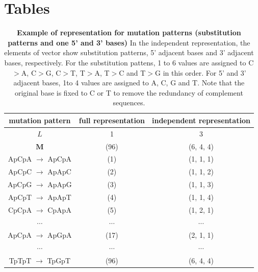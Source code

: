 \newpage

 \section*{Tables}
% 
%
%




\begin{table}[!ht]
\caption{
{\bf Example of representation for mutation patterns (substitution patterns and one 5' and 3' bases)}
In the independent representation, the elements of vector show substitution patterns, 5' adjacent bases and 3' adjacent bases, respectively.
For the substitution pattens, 1 to 6 values are assigned to C$>$A, C$>$G, C$>$T, T$>$A, T$>$C and T$>$G in this order.
For 5' and 3' adjacent bases, 1to 4 values are assigned to A, C, G and T.
Note that the original base is fixed to C or T to remove the redundancy of complement sequences.
}
\begin{center}
\begin{tabular}{|c|c|c|} \hline
mutation pattern & full representation & independent representation  \\ \hline
$L$ & 1  & 3  \\
$\bm{M}$ & (96)  & (6, 4, 4) \\  \hline
ApCpA $\to$ ApCpA & (1)  & (1, 1, 1)  \\ 
ApCpC $\to$ ApApC & (2)  & (1, 1, 2)  \\ 
ApCpG $\to$ ApApG & (3)  & (1, 1, 3)  \\
ApCpT $\to$ ApApT & (4)  & (1, 1, 4)  \\
CpCpA $\to$ CpApA & (5)  & (1, 2, 1) \\
$\cdots$ & $\cdots$ & $\cdots$ \\
ApCpA $\to$ ApGpA & (17)  & (2, 1, 1) \\
$\cdots$ & $\cdots$ & $\cdots$ \\
TpTpT $\to$ TpGpT & (96)  & (6, 4, 4) \\ \hline
\end{tabular}
\end{center}
\label{tab_rep}
\end{table}



